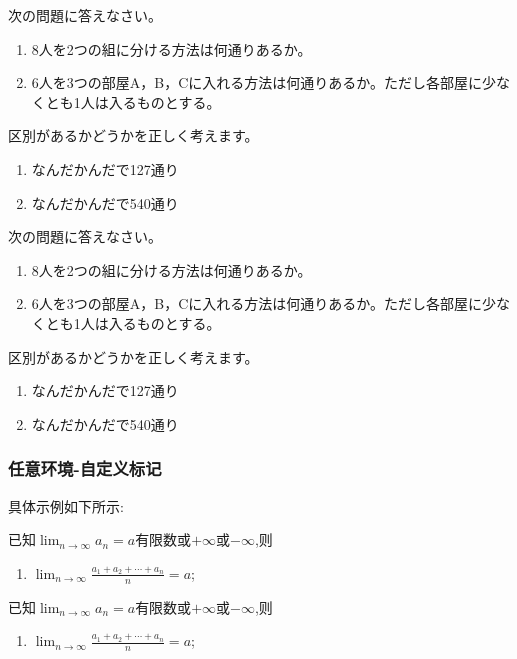 \begin{tcblisting}{}
\begin{reidai}
    次の問題に答えなさい。
    \begin{enumerate}
        \item 8人を2つの組に分ける方法は何通りあるか。
        \item 6人を3つの部屋A，B，Cに入れる方法は何通りあるか。ただし各部屋に少なくとも1人は入るものとする。
    \end{enumerate}
    \tcblower
    区別があるかどうかを正しく考えます。
    \begin{enumerate}
        \item なんだかんだで127通り
        \item なんだかんだで540通り
    \end{enumerate}
\end{reidai}
\end{tcblisting}

\begin{reidai}
    次の問題に答えなさい。
    \begin{enumerate}
        \item 8人を2つの組に分ける方法は何通りあるか。
        \item 6人を3つの部屋A，B，Cに入れる方法は何通りあるか。ただし各部屋に少なくとも1人は入るものとする。
    \end{enumerate}
    \tcblower
    区別があるかどうかを正しく考えます。
    \begin{enumerate}
        \item なんだかんだで127通り
        \item なんだかんだで540通り
    \end{enumerate}
\end{reidai}


\subsubsection{任意环境-自定义标记}
具体示例如下所示:
\begin{anymark}[总结~证明极限存在性常用二法]
    已知$\lim_{n\to\infty}a_n=a$\;有限数或$+\infty$或$-\infty$,则
    \begin{enumerate}
        \item $\lim_{n\to\infty}\frac{a_1+a_2+\cdots+a_n}{n}=a$;
    \end{enumerate}
\end{anymark}
\begin{tcblisting}{}
\begin{anymark}[总结~证明极限存在性常用二法]
已知$\lim_{n\to\infty}a_n=a$\;有限数或$+\infty$或$-\infty$,则
\begin{enumerate}
    \item $\lim_{n\to\infty}\frac{a_1+a_2+\cdots+a_n}{n}=a$;
\end{enumerate}
\end{anymark}
\end{tcblisting}

